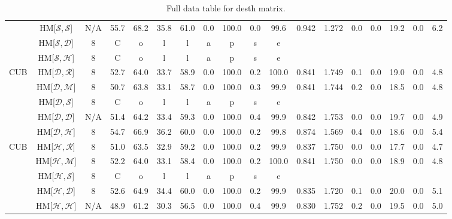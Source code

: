 \begin{table*}
{\begin{tabular}{c|cc|cccc|ccccc|ccccc|c}
 & HM{[}$\mathcal{S},\mathcal{S}${]} & N/A & 55.7 & 68.2 & 35.8 & 61.0 & 0.0 & 100.0 & 0.0 & 99.6 & 0.942 & 1.272 & 0.0 & 0.0 & 19.2 & 0.0 & 6.2\tabularnewline
 & HM{[}$\mathcal{S},\mathcal{D}${]} & 8 & C & o & l & l & a & p & s & e &  &  &  &  &  &  & \tabularnewline
 & HM{[}$\mathcal{S},\mathcal{H}${]} & 8 & C & o & l & l & a & p & s & e &  &  &  &  &  &  & \tabularnewline
\hline 
\multirow{5}{*}{CUB} & HM{[}$\mathcal{D},\mathcal{R}${]} & 8 & 52.7 & 64.0 & 33.7 & 58.9 & 0.0 & 100.0 & 0.2 & 100.0 & 0.841 & 1.749 & 0.1 & 0.0 & 19.0 & 0.0 & 4.8\tabularnewline
 & HM{[}$\mathcal{D},\mathcal{M}${]} & 8 & 50.7 & 63.8 & 33.1 & 58.7 & 0.0 & 100.0 & 0.3 & 99.9 & 0.841 & 1.744 & 0.2 & 0.0 & 18.5 & 0.0 & 4.8\tabularnewline
 & HM{[}$\mathcal{D},\mathcal{S}${]} & 8 & C & o & l & l & a & p & s & e &  &  &  &  &  &  & \tabularnewline
 & HM{[}$\mathcal{D},\mathcal{D}${]} & N/A & 51.4 & 64.2 & 33.4 & 59.3 & 0.0 & 100.0 & 0.4 & 99.9 & 0.842 & 1.753 & 0.0 & 0.0 & 19.7 & 0.0 & 4.9\tabularnewline
 & HM{[}$\mathcal{D},\mathcal{H}${]} & 8 & 54.7 & 66.9 & 36.2 & 60.0 & 0.0 & 100.0 & 0.2 & 99.8 & 0.874 & 1.569 & 0.4 & 0.0 & 18.6 & 0.0 & 5.4\tabularnewline
\hline 
\multirow{5}{*}{CUB} & HM{[}$\mathcal{H},\mathcal{R}${]} & 8 & 51.0 & 63.5 & 32.9 & 59.2 & 0.0 & 100.0 & 0.2 & 99.9 & 0.837 & 1.750 & 0.0 & 0.0 & 17.7 & 0.0 & 4.7\tabularnewline
 & HM{[}$\mathcal{H},\mathcal{M}${]} & 8 & 52.2 & 64.0 & 33.1 & 58.4 & 0.0 & 100.0 & 0.2 & 100.0 & 0.841 & 1.750 & 0.0 & 0.0 & 18.9 & 0.0 & 4.8\tabularnewline
 & HM{[}$\mathcal{H},\mathcal{S}${]} & 8 & C & o & l & l & a & p & s & e &  &  &  &  &  &  & \tabularnewline
 & HM{[}$\mathcal{H},\mathcal{D}${]} & 8 & 52.6 & 64.9 & 34.4 & 60.0 & 0.0 & 100.0 & 0.2 & 99.9 & 0.835 & 1.720 & 0.1 & 0.0 & 20.0 & 0.0 & 5.1\tabularnewline
 & HM{[}$\mathcal{H},\mathcal{H}${]} & N/A & 48.9 & 61.2 & 30.3 & 56.5 & 0.0 & 100.0 & 0.4 & 99.9 & 0.830 & 1.752 & 0.2 & 0.0 & 19.5 & 0.0 & 5.0\tabularnewline
\end{tabular}}

\caption{Full data table for desth matrix.}
\label{tab:srcdest}
\end{table*}
